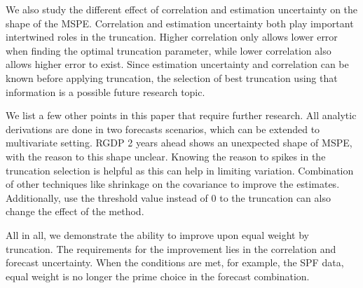\documentclass[11pt]{article}
\begin{document}
We also study the different effect of correlation and estimation uncertainty on the shape of the MSPE. Correlation and estimation uncertainty both play important intertwined roles in the truncation. Higher correlation only allows lower error when finding the optimal truncation parameter, while lower correlation also allows higher error to exist. Since estimation uncertainty and correlation can be known before applying truncation, the selection of best truncation using that information is a possible future research topic.

We list a few other points in this paper that require further research. All analytic derivations are done in two forecasts scenarios, which can be extended to multivariate setting. 
RGDP 2 years ahead shows an unexpected shape of MSPE, with the reason to this shape unclear.
Knowing the reason to spikes in the truncation selection is helpful as this can help in limiting variation.
Combination of other techniques like shrinkage on the covariance to improve the estimates. Additionally, use the threshold value instead of 0 to the truncation can also change the effect of the method.

All in all, we demonstrate the ability to improve upon equal weight by truncation. The requirements for the improvement lies in the correlation and forecast uncertainty. When the conditions are met, for example, the SPF data, equal weight is no longer the prime choice in the forecast combination. 

\newpage



\end{document}

